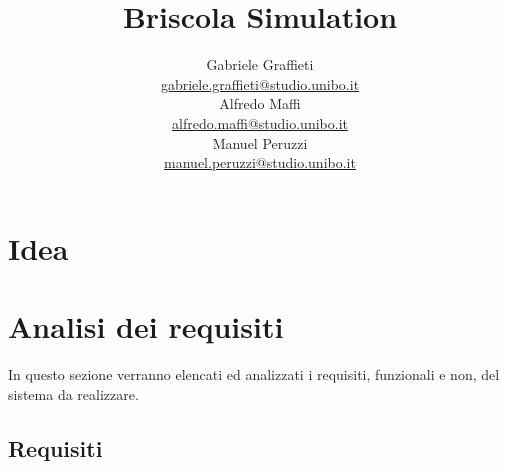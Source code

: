 \documentclass[a4paper,12pt]{article}
\title{\Huge \textbf{Briscola Simulation} \\
	\vspace{10pt}
	\vspace{20pt}
}
\author{
	Gabriele Graffieti \\ \small \url{gabriele.graffieti@studio.unibo.it}
	\vspace{15pt}
	\\
	Alfredo Maffi \\ \small \url{alfredo.maffi@studio.unibo.it}
	\vspace{15pt}
	\\
	Manuel Peruzzi \\ \small \url{manuel.peruzzi@studio.unibo.it}
}
\date{}
\begin{document}
\maketitle
{}
\newpage
\tableofcontents
\newpage
\section{Idea}


\section{Analisi dei requisiti} \label{requirements-analysis}

In questo sezione verranno elencati ed analizzati i requisiti, funzionali e non, del sistema da realizzare. 

\subsection{Requisiti}
\end{document}
